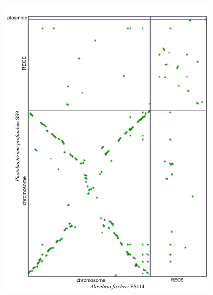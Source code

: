 \begin{figure}[H]
\begin{center}
\begin{minipage}{0.5\textwidth}
   		\includegraphics[width=\textwidth]{./img/synteny/new/fig8_12d.png}
   		\label{figsyntvib4}
	\end{minipage}
\end{center}
\end{figure} 

